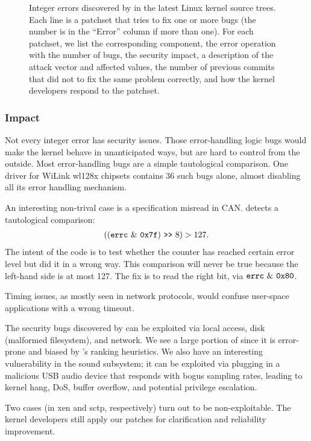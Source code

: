 \begin{figure*}
\centering
\footnotesize

\caption{Integer errors discovered by \sys in the latest Linux
kernel source trees.  Each line is a patchset that tries to fix one
or more bugs (the number is in the ``Error'' column if more than
one).  For each patchset, we list the corresponding component, the
error operation with the number of bugs, the security impact, a
description of the attack vector and affected values, the number
of previous commits that did not to fix the same problem correctly,
and how the kernel developers respond to the patchset.}
\label{f:data:linux}
\end{figure*}

\subsubsection{Impact}

Not every integer error has security issues.  Those error-handling
logic bugs would make the kernel behave in unanticipated ways, but
are hard to control from the outside.  Most error-handling bugs are
a simple tautological comparison.  One driver for WiLink wl128x
chipsets contains 36 such bugs alone, almost disabling all its error
handling mechanism.

An interesting non-trival case is a specification misread in CAN.
\sys detects a tautological comparison:
\begin{align*}
((\texttt{errc}\ \&\ \texttt{0x7f}) \ \texttt{>}\texttt{>}\  8) > 127.
\end{align*}
The intent of the code is to test whether the counter has reached
certain error level but did it in a wrong way.  This comparison
will never be true because the left-hand side is at most 127.  The
fix is to read the right bit, via $\texttt{errc}\ \&\ \texttt{0x80}$.

Timing issues, as mostly seen in network protocols, would confuse
user-space applications with a wrong timeout.

The security bugs discovered by \sys can be exploited via local
access, disk (malformed filesystem), and network.  We see a large
portion of  since it is error-prone and biased by \sys's
ranking heuristics.  We also have an interesting vulnerability in
the sound subsystem; it can be exploited via plugging in a malicious
USB audio device that responds with bogus sampling rates, leading
to kernel hang, DoS, buffer overflow, and potential privilege
escalation.

Two cases (in xen and sctp, respectively) turn out to be non-exploitable.
The kernel developers still apply our patches for clarification and
reliability improvement.

